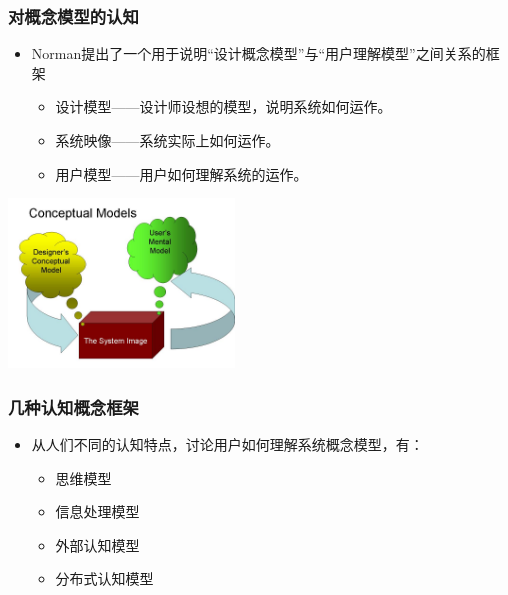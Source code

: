 \documentclass{beamer}
\begin{document}
{
\frame[plain]{\transdissolve}
}

\begin{frame}
	\frametitle{对概念模型的认知}
	\begin{itemize}
		\item Norman提出了一个用于说明“设计概念模型”与“用户理解模型”之间关系的框架~\cite{norman1988psychology, norman2002design}
		\begin{itemize}
			\item 设计模型——设计师设想的模型，说明系统如何运作。
			\item 系统映像——系统实际上如何运作。
			\item 用户模型——用户如何理解系统的运作。
		\end{itemize}
	\end{itemize}
	\begin{center}
		\includegraphics[width=6cm]{images/norman_model.jpg}
	\end{center}
\end{frame}

\begin{frame}
	\frametitle{几种认知概念框架}
	\begin{itemize}
		\item 从人们不同的认知特点，讨论用户如何理解系统概念模型，有：
		\begin{itemize}
			\item 思维模型
			\item 信息处理模型
			\item 外部认知模型
			\item 分布式认知模型
		\end{itemize}
	\end{itemize}
\end{frame}
\end{document}
